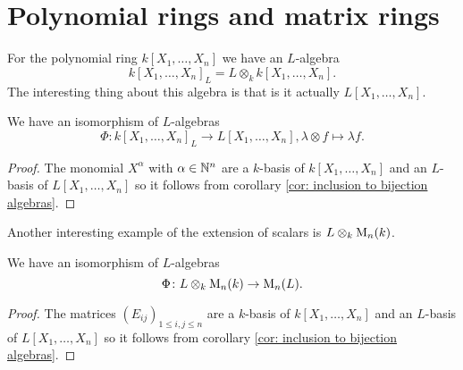 \section{Polynomial rings and matrix rings}


For the polynomial ring $k[X_1, \dotsc, X_n]$ we have an $L$-algebra
\[
 k[X_1, \dotsc, X_n]_L = L \otimes_k k[X_1, \dotsc, X_n].
\]
The interesting thing about this algebra is that is it actually $L[X_1, \dotsc, X_n]$.


\begin{prop}
 We have an isomorphism of $L$-algebras
 \[
  \Phi \colon k[X_1, \dotsc, X_n]_L \to L[X_1, \dotsc, X_n], \lambda \otimes f \mapsto \lambda f.
 \]
\end{prop}
\begin{proof}
 The monomial $X^\alpha$ with $\alpha \in \mathbb{N}^n$ are a $k$-basis of $k[X_1, \dotsc, X_n]$ and an $L$-basis of $L[X_1, \dotsc, X_n]$ so it follows from corollary \ref{cor: inclusion to bijection algebras}.
\end{proof}


Another interesting example of the extension of scalars is $L \otimes_k \operatorname{M}_n(k)$.


\begin{prop}
 We have an isomorphism of $L$-algebras
 \[
  \Phi \colon L \otimes_k \operatorname{M}_n(k) \to \operatorname{M}_n(L).
 \]
\end{prop}
\begin{proof}
 The matrices $(E_{ij})_{1 \leq i,j \leq n}$ are a $k$-basis of $k[X_1, \dotsc, X_n]$ and an $L$-basis of $L[X_1, \dotsc, X_n]$ so it follows from corollary \ref{cor: inclusion to bijection algebras}.
\end{proof}





















